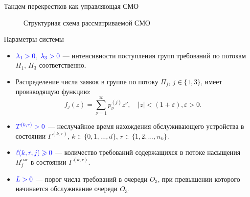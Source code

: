 \documentclass[10pt]{beamer}
\begin{document}
\begin{frame}{Тандем перекрестков как управляющая СМО}
  \begin{figure}[h]
    \centering
    \caption{Структурная схема рассматриваемой СМО}
    \label{VK:fig:2}
  \end{figure}
\end{frame} 


\begin{frame}{Параметры системы}
\begin{itemize}
    \item 
$\color{blue}\lambda_1>0$, $\color{blue}\lambda_3>0$ --- интенсивности поступления групп требований по потокам  $\Pi_1$, $\Pi_3$ соответственно.
  \item 
{\color{blue}Распределение числа заявок в группе} по потоку $\Pi_j$, $j \in \{1,3\}$, имеет производящую функцию:
$$
f_j(z) = \sum_{\nu=1}^{\infty} p_{\nu}^{(j)} z ^{\nu}, \quad |z|<(1+\varepsilon), \varepsilon>0.
$$
  \item 
$\color{blue}T^{(k,r)}>0$ --- неслучайное время нахождения обслуживающего устройства в состоянии $\Gamma^{(k,r)}$, $k\in \{0, 1, \ldots, d\}$, $r \in \{1, 2, \ldots, n_k\}$.  
  \item 
$\color{blue}\ell(k,r,j)\geqslant 0$ --- количество требований содержащихся в потоке насыщения $\Pi^{\text{нас}}_j$ в состоянии  $\Gamma^{(k,r)}$.
  \item 
$\color{blue}L > 0$ --- порог числа требований в очереди $O_3$, при превышении которого начинается обслуживание очереди $O_3$.
\end{itemize}

\end{frame}
\end{document}
